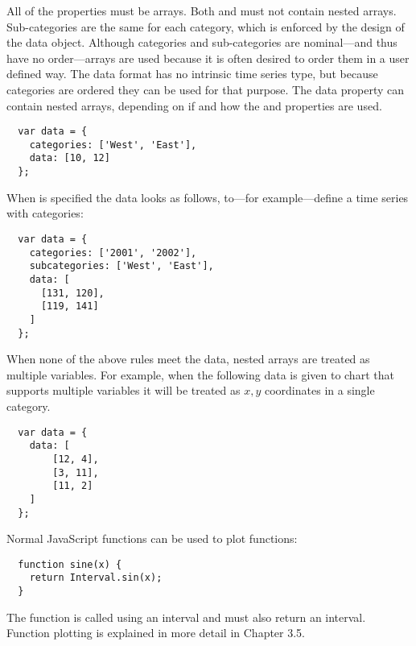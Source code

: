 All of the properties must be arrays. Both  and  must not contain nested arrays. Sub-categories are the same for each category, which is enforced by the design of the data object. Although categories and sub-categories are nominal---and thus have no order---arrays are used because it is often desired to order them in a user defined way. The data format has no intrinsic time series type, but because categories are ordered they can be used for that purpose. The data property can contain nested arrays, depending on if and how the  and  properties are used.
\begin{verbatim}
  var data = {
    categories: ['West', 'East'],
    data: [10, 12]
  };
\end{verbatim}

When  is specified the data looks as follows, to---for example---define a time series with categories:
\begin{verbatim}
  var data = {
    categories: ['2001', '2002'],
    subcategories: ['West', 'East'],
    data: [
      [131, 120],
      [119, 141]
    ]
  };
\end{verbatim}

When none of the above rules meet the data, nested arrays are treated as multiple variables. For example, when the following data is given to chart that supports multiple variables it will be treated as $x, y$ coordinates in a single category.

\begin{verbatim}
  var data = {
    data: [
        [12, 4],
        [3, 11],
        [11, 2]
    ]
  };
\end{verbatim}

Normal JavaScript functions can be used to plot functions:

\begin{verbatim}
  function sine(x) {
    return Interval.sin(x);
  }
\end{verbatim}

The function is called using an interval and must also return an interval. Function plotting is explained in more detail in Chapter 3.5.
